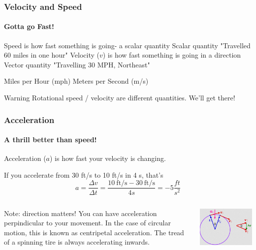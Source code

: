 \documentclass{article}%
\begin{document}
\begin{frame}
\frametitle{Velocity and Speed}
\framesubtitle{Gotta go Fast!}

\begin{outline}
	\1 Speed is how fast something is going- a scalar quantity
		\2 Scalar quantity
		\2 "Travelled 60 miles in one hour"
	\1 Velocity ($v$) is how fast something is going in a direction
		\2 Vector quantity
		\2 "Travelling 30 MPH, Northeast"
\end{outline}

\begin{examples}
\begin{outline}
	\1 Miles per Hour (mph)
	\1 Meters per Second (m/s)
\end{outline}
\end{examples}

\begin{alertblock}{Warning}
	Rotational speed / velocity are different quantities. We'll get there!
\end{alertblock}

\end{frame}


\begin{frame}
\frametitle{Acceleration}
\framesubtitle{A thrill better than speed!}

Acceleration ($a$) is how fast your velocity is changing.

If you accelerate from 30 ft/s to 10 ft/s in 4 s, that's
\begin{equation}
	a = \frac{\Delta v}{\Delta t} = \frac{10 \ \mbox{ft/s} - 30 \ \mbox{ft/s}}{4 s} = - 5 \frac{ft}{s^2} \nonumber
\end{equation} 
\begin{columns}
Note: direction matters! You can have acceleration perpindicular to your movement. In the case of circular motion, this is known as centripetal acceleration. The tread of a spinning tire is always accelerating inwards.

\includegraphics[width=1.0\textwidth]{img_Mechatronics_Terminology_centrip.png}
\end{columns}

\end{frame}
\end{document}

